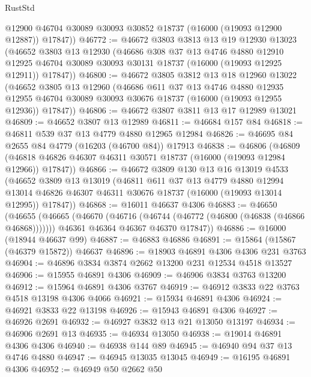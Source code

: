\begin{lexlean}{RustStd}
\begin{coremodule}
        @12900
        @46704
        @30089
        @30093
        @30852
        @18737
        (@16000 (@19093 @12900 @12887))
        @17847))
@46772 := @46672
    @3803
    @3813
    @13
    @19
    @12930
    @13023
    (@46652
      @3803
      @13
      @12930
      (@46686
        @308
        @37
        @13
        @4746
        @4880
        @12910
        @12925
        @46704
        @30089
        @30093
        @30131
        @18737
        (@16000 (@19093 @12925 @12911))
        @17847))
@46800 := @46672
    @3805
    @3812
    @13
    @18
    @12960
    @13022
    (@46652
      @3805
      @13
      @12960
      (@46686
        @611
        @37
        @13
        @4746
        @4880
        @12935
        @12955
        @46704
        @30089
        @30093
        @30676
        @18737
        (@16000 (@19093 @12955 @12936))
        @17847))
@46806 := @46672 @3807 @3811 @13 @17 @12989 @13021
@46809 := @46652 @3807 @13 @12989
@46811 := @46684 @157 @84
@46818 := @46811 @539 @37 @13 @4779 @4880 @12965 @12984
@46826 := @46695 @84 @2655 @84 @4779 (@16203 (@46700 @84)) @17913
@46838 := @46806
    (@46809 (@46818 @46826 @46307 @46311 @30571 @18737 (@16000 (@19093 @12984 @12966)) @17847))
@46866 := @46672
    @3809
    @130
    @13
    @16
    @13019
    @4533
    (@46652
      @3809
      @13
      @13019
      (@46811
        @611
        @37
        @13
        @4779
        @4880
        @12994
        @13014
        @46826
        @46307
        @46311
        @30676
        @18737
        (@16000 (@19093 @13014 @12995))
        @17847))
@46868 := @16011 @46637 @4306
@46883 := @46650
    (@46655
      (@46665
        (@46670 (@46716 (@46744 (@46772 (@46800 (@46838 (@46866 @46868)))))))
        @46361
        @46364
        @46367
        @46370
        @17847))
@46886 := @16000 (@18944 @46637 @99)
@46887 := @46883 @46886
@46891 := @15864 (@15867 (@46379 @15872)) @46637
@46896 := @18903 @46891 @4306 @4306 @231 @3763
@46904 := @46896 @3834 @3874 @2662 @13200 @231 @12534 @4518 @13527
@46906 := @15955 @46891 @4306
@46909 := @46906 @3834 @3763 @13200
@46912 := @15964 @46891 @4306 @3767
@46919 := @46912 @3833 @22 @3763 @4518 @13198 @4306 @4066
@46921 := @15934 @46891 @4306
@46924 := @46921 @3833 @22 @13198
@46926 := @15943 @46891 @4306
@46927 := @46926 @2691
@46932 := @46927 @3832 @13 @21 @13050 @13197
@46934 := @46906 @2691 @13
@46935 := @46934 @13050
@46938 := @19014 @46891 @4306 @4306
@46940 := @46938 @144 @89
@46945 := @46940 @94 @37 @13 @4746 @4880
@46947 := @46945 @13035 @13045
@46949 := @16195 @46891 @4306
@46952 := @46949 @50 @2662 @50

\end{coremodule}
\end{lexlean}
